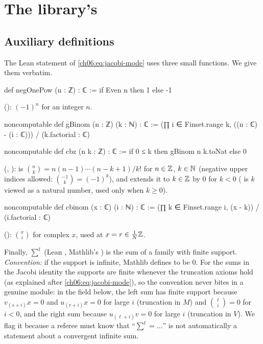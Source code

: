 \section{The library's \texorpdfstring{}{TwistedModule}}\label{ch06:sec:tm}

\subsection{Auxiliary definitions}

The Lean statement of \eqref{ch06:eq:jacobi-mode} uses three small functions.  We give them
verbatim.
\begin{leancode}
def negOnePow (n : ℤ) : ℂ := if Even n then 1 else -1
\end{leancode}
(): $(-1)^n$ for an integer $n$.
\begin{leancode}
noncomputable def gBinom (n : ℤ) (k : ℕ) : ℂ :=
  (∏ i ∈ Finset.range k, ((n : ℂ) - (i : ℂ))) / (k.factorial : ℂ)

noncomputable def cbz (n k : ℤ) : ℂ := if 0 ≤ k then gBinom n k.toNat else 0
\end{leancode}
(, ):
 is $\binom nk=n(n-1)\cdots(n-k+1)/k!$ for $n\in{\mathbb{Z}}$, $k\in{\mathbb{N}}$ (negative upper
indices allowed: $\binom{-1}{k}=(-1)^k$), and  extends it to $k\in{\mathbb{Z}}$ by $0$ for
$k<0$ ( is $k$ viewed as a natural number, used only when $k\ge0$).
\begin{leancode}
noncomputable def cbinom (x : ℂ) (i : ℕ) : ℂ :=
  (∏ k ∈ Finset.range i, (x - k)) / (i.factorial : ℂ)
\end{leancode}
(): $\binom xi$ for complex $x$, used at $x=r\in\frac1N{\mathbb{Z}}$.

Finally, $\sum^{\mathrm f}$ (Lean , Mathlib's ) is the sum of a family with
finite support.  \emph{Convention:} if the support is infinite, Mathlib defines  to be
$0$.  For the sums in the Jacobi identity the supports are finite whenever the truncation axioms
hold (as explained after \eqref{ch06:eq:jacobi-mode}), so the convention never bites in a genuine
module: in the field  below, the left sum has finite support because
$v_{(s+i)}x=0$ and $u_{(r+i)}x=0$ for large $i$ (truncation in $M$) and $\binom\ell i=0$ for
$i<0$, and the right sum because $u_{(\ell+i)}v=0$ for large $i$ (truncation in $V$).  We flag it because a referee must know that ``$\sum^{\mathrm f}=\dots$'' is not
automatically a statement about a convergent infinite sum.

